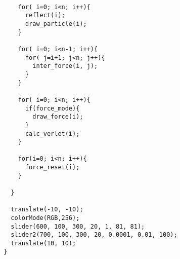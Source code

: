 \begin{framed}
{\begin{verbatim}
    
    for( i=0; i<n; i++){
      reflect(i);
      draw_particle(i);
    }
    
    for( i=0; i<n-1; i++){
      for( j=i+1; j<n; j++){
        inter_force(i, j);
      }
    }
    
    for( i=0; i<n; i++){
      if(force_mode){
        draw_force(i);
      }
      calc_verlet(i); 
    }
    
    for(i=0; i<n; i++){
      force_reset(i);  
    }

  }
  
  translate(-10, -10);
  colorMode(RGB,256);
  slider(600, 100, 300, 20, 1, 81, 81);
  slider2(700, 100, 300, 20, 0.0001, 0.01, 100);
  translate(10, 10);
}
\end{verbatim}}
\end{framed}